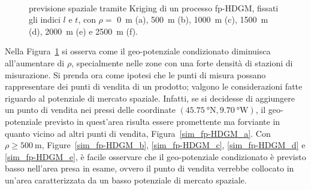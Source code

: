 \begin{figure}[htbp]
	\
	\caption[Previsione spaziale tramite Kriging di un processo fp-HDGM al variare di $\rho$]{previsione spaziale tramite Kriging di un processo fp-HDGM, fissati gli indici $l$ e $t$, con $\rho=$ \SI{0}{\meter} (a), \SI{500}{\meter} (b), \SI{1000}{\meter} (c), \SI{1500}{\meter} (d), \SI{2000}{\meter} (e) e \SI{2500}{\meter} (f).}
	\label{sim_fp-HDGM}
\end{figure}
Nella Figura~\ref{sim_fp-HDGM} si osserva come il geo-potenziale condizionato diminuisca all'aumentare di $\rho$, specialmente nelle zone con una forte densità di stazioni di misurazione. Si prenda ora come ipotesi che le punti di misura possano rappresentare dei punti di vendita di un prodotto; valgono le considerazioni fatte riguardo al potenziale di mercato spaziale. Infatti, se si decidesse di aggiungere un punto di vendita nei pressi delle coordinate $(\SI{45.75}{\degree} \text{N}, \SI{9.70}{\degree} \text{W})$, il geo-potenziale previsto in quest'area risulta essere promettente ma forviante in quanto vicino ad altri punti di vendita, Figura~\ref{sim_fp-HDGM_a}. Con $\rho \geq \SI{500}{\meter}$, Figure~\ref{sim_fp-HDGM_b}, \ref{sim_fp-HDGM_c},  \ref{sim_fp-HDGM_d} e \ref{sim_fp-HDGM_e}, è facile osservare che il geo-potenziale condizionato è previsto basso nell'area presa in esame, ovvero il punto di vendita verrebbe collocato in un'area caratterizzata da un basso potenziale di mercato spaziale.